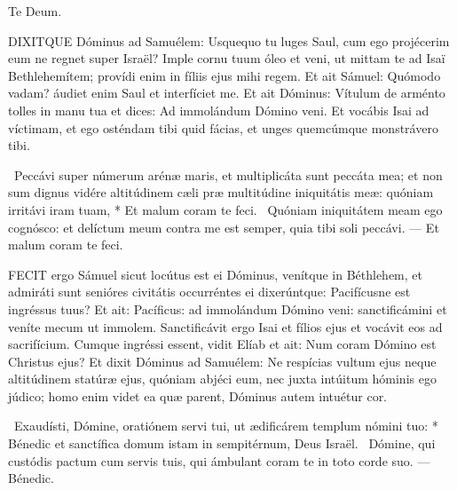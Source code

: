 Te Deum.





\lettrine[lines=2]{D}{IXITQUE} Dóminus ad Samuélem: Usquequo tu luges Saul, cum ego projécerim eum ne regnet super Israël? Imple cornu tuum óleo et veni, ut mittam te ad Isaï Bethlehemítem; provídi enim in fíliis ejus mihi regem. Et ait Sámuel: Quómodo vadam? áudiet enim Saul et interfíciet me. Et ait Dóminus: Vítulum de arménto tolles in manu tua et dices: Ad immolándum Dómino veni. Et vocábis Isai ad víctimam, et ego osténdam tibi quid fácias, et unges quemcúmque monstrávero tibi.

\R\ Peccávi super númerum arénæ maris, et multiplicáta sunt peccáta mea; et non sum dignus vidére altitúdinem cæli præ multitúdine iniquitátis meæ: quóniam irritávi iram tuam, * Et malum coram te feci. \V\ Quóniam iniquitátem meam ego cognósco: et delíctum meum contra me est semper, quia tibi soli peccávi. --- Et malum coram te feci.


\lettrine[lines=2]{F}{ECIT} ergo Sámuel sicut locútus est ei Dóminus, venítque in Béthlehem, et admiráti sunt senióres civitátis occurréntes ei dixerúntque: Pacifícusne est ingréssus tuus? Et ait: Pacíficus: ad immolándum Dómino veni: sanctificámini et veníte mecum ut immolem. Sanctificávit ergo Isai et fílios ejus et vocávit eos ad sacrifícium. Cumque ingréssi essent, vidit Elíab et ait: Num coram Dómino est Christus ejus? Et dixit Dóminus ad Samuélem: Ne respícias vultum ejus neque altitúdinem statúræ ejus, quóniam abjéci eum, nec juxta intúitum hóminis ego júdico; homo enim videt ea quæ parent, Dóminus autem intuétur cor.

\R\ Exaudísti, Dómine, oratiónem servi tui, ut ædificárem templum nómini tuo: * Bénedic et sanctífica domum istam in sempitérnum, Deus Israël. \V\ Dómine, qui custódis pactum cum servis tuis, qui ámbulant coram te in toto corde suo. --- Bénedic.


